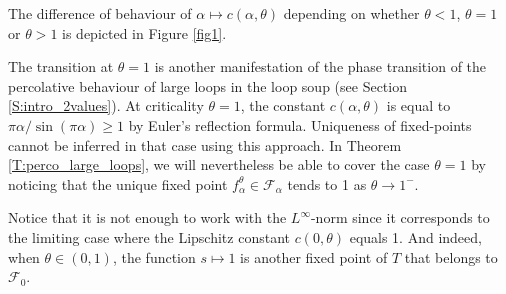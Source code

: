 \documentclass[11pt]{article}
\theoremstyle{remark}
\newcommand{\Fc}{\mathcal{F}}
\numberwithin{equation}{section}
\begin{document}
The difference of behaviour of $\alpha \mapsto c(\alpha, \theta)$ depending on whether $\theta < 1$, $\theta =1$ or $\theta >1$ is depicted in Figure \ref{fig1}.

The transition at $\theta = 1$ is another manifestation of the phase transition of the percolative behaviour of large loops in the loop soup (see Section \ref{S:intro_2values}). At criticality $\theta = 1$, the constant $c(\alpha, \theta)$ is equal to $\pi \alpha / \sin (\pi \alpha) \geq 1$ by Euler's reflection formula. Uniqueness of fixed-points cannot be inferred in that case using this approach. In Theorem \ref{T:perco_large_loops}, we will nevertheless be able to cover the case $\theta = 1$ by noticing that the unique fixed point $f_\alpha^\theta \in \Fc_\alpha$ tends to 1 as $\theta \to 1^-$.

Notice that it is not enough to work with the $L^\infty$-norm since it corresponds to the limiting case where the Lipschitz constant $c(0,\theta)$ equals 1. And indeed, when $\theta \in (0,1)$, the function $s \mapsto 1$ is another fixed point of $T$ that belongs to $\Fc_0$.
\end{document}
